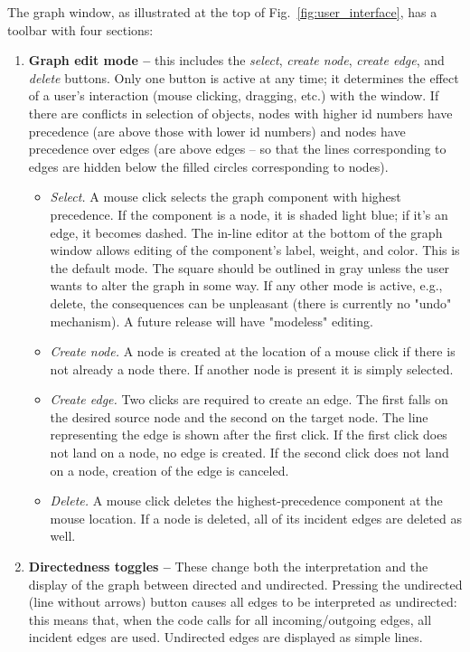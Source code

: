 The graph window, as illustrated at the top of Fig.~\ref{fig:user_interface},
has a toolbar with four sections:
\begin{enumerate}
\item
\textbf{Graph edit mode -- }
this includes the \emph{select}, \emph{create node}, \emph{create edge}, and \emph{delete} buttons.
Only one button is active at any time; it determines the effect
of a user's interaction (mouse clicking, dragging, etc.) with the window.
If there are conflicts in selection of objects, nodes with higher id numbers have precedence (are above those with lower id numbers) and nodes
have precedence over edges (are above edges -- so that the lines
corresponding to edges are hidden below the filled circles corresponding to nodes).
\begin{itemize}
\item \emph{Select.} A mouse click selects the graph component with highest
  precedence.  If the component is a node, it is shaded light blue; if it's
  an edge, it becomes dashed.  The in-line editor at the bottom of the graph
  window allows editing of the component's label, weight, and color.  This is
  the default mode.  The square should be outlined in gray unless the user
  wants to alter the graph in some way. If any other mode is active, e.g.,
  delete, the consequences can be unpleasant (there is currently no "undo"
  mechanism). A future release will have "modeless" editing.
\item \emph{Create node.}
A node is created at the location of a mouse click if there is not already a node there.
If another node is present it is simply selected.
\item \emph{Create edge.}
Two clicks are required to create an edge. The first falls on the desired
source node and the second on the target node.
The line representing the edge is shown after the first click.
If the first click does not land on a node, no edge is created.
If the second click does not land on a node, creation of the edge is canceled.
\item \emph{Delete.}
A mouse click deletes the highest-precedence component at the mouse location.
If a node is deleted, all of its incident edges are deleted as well.
\end{itemize}

\item
\textbf{Directedness toggles --}
These change both the interpretation and the
display of the graph between directed and undirected.
Pressing the undirected (line without arrows) button causes
all edges to be interpreted as undirected: this means that, when the code
calls for all incoming/outgoing edges, all incident edges are used.
Undirected edges are displayed as simple lines.


\end{enumerate}
